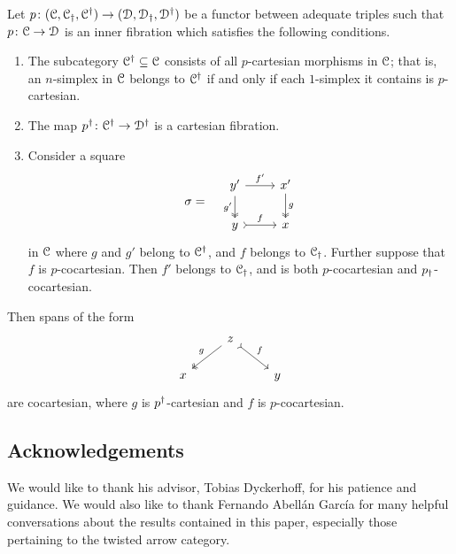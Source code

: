 \documentclass[main.tex]{subfiles}
\begin{document}
\begin{theorem}
  \label{thm:new_barwick}
  Let $p\colon (\mathcal{C}, \mathcal{C}_{\dagger}, \mathcal{C}^{\dagger}) \to (\mathcal{D}, \mathcal{D}_{\dagger}, \mathcal{D}^{\dagger})$ be a functor between adequate triples such that $p\colon \mathcal{C} \to \mathcal{D}$ is an inner fibration which satisfies the following conditions.
  \begin{enumerate}
    \item The subcategory $\mathcal{C}^{\dagger} \subseteq \mathcal{C}$ consists of all $p$-cartesian morphisms in $\mathcal{C}$; that is, an $n$-simplex in $\mathcal{C}$ belongs to $\mathcal{C}^{\dagger}$ if and only if each $1$-simplex it contains is $p$-cartesian.

    \item The map $p^{\dagger}\colon \mathcal{C}^{\dagger} \to \mathcal{D}^{\dagger}$ is a cartesian fibration.

    \item Consider a square
      \begin{equation*}
          \sigma = \quad
          \begin{tikzcd}
            y'
            \arrow[r, "f'"]
            \arrow[d, two heads, swap, "g'"]
            & x'
            \arrow[d, two heads, "g"]
            \\
            y
            \arrow[r, rightarrowtail, "f"]
            & x
          \end{tikzcd}
      \end{equation*}
      in $\mathcal{C}$ where $g$ and $g'$ belong to $\mathcal{C}^{\dagger}$, and $f$ belongs to $\mathcal{C}_{\dagger}$. Further suppose that $f$ is $p$-cocartesian. Then $f'$ belongs to $\mathcal{C}_{\dagger}$, and is both $p$-cocartesian and $p_{\dagger}$-cocartesian.
  \end{enumerate}
  Then spans of the form
  \begin{equation*}
    \begin{tikzcd}
      & z
      \arrow[dl, two heads, swap, "g"]
      \arrow[dr, rightarrowtail, "f"]
      \\
      x
      && y
    \end{tikzcd}
  \end{equation*}
  are cocartesian, where $g$ is $p^{\dagger}$-cartesian and $f$ is $p$-cocartesian.
\end{theorem}

\subsection{Acknowledgements}
\label{ssc:acknowledgements}

We would like to thank his advisor, Tobias Dyckerhoff, for his patience and guidance. We would also like to thank Fernando Abell{\'a}n Garc{\'i}a for many helpful conversations about the results contained in this paper, especially those pertaining to the twisted arrow category.
\end{document}
